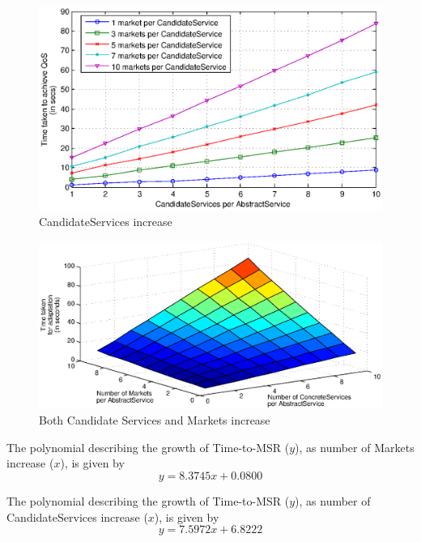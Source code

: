 \documentclass[10pt,journal,compsoc]{IEEEtran}
\begin{document}
\begin{figure}[htbp]
  \centering
  \includegraphics[clip, trim=0cm 14cm 3cm 6cm, scale=0.4]{Figure19.eps}
  \caption{CandidateServices increase\label{fig:mkt_per_svc}}
\end{figure}

\begin{figure}[htbp]%
	\centering
	\includegraphics[clip, trim=2cm 10cm 1cm 10cm, scale=0.5]{Figure20.eps}
	\caption{Both Candidate Services and Markets increase \label{fig:svc_and_mkts_scaling}}%
\end{figure}

The polynomial describing the growth of Time-to-MSR ($y$), as number of Markets increase ($x$), is given  by
\begin{equation}
    y =  8.3745x  +  0.0800 \label{eq:mkt_vs_cand}
\end{equation}

The polynomial describing the growth of Time-to-MSR ($y$), as number of CandidateServices increase ($x$), is given  by
\begin{equation}
    y =   7.5972x  +  6.8222 \label{eq:cand_vs_mkt}
\end{equation}
\end{document}
